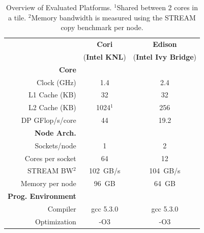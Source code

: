 
{
\setlength{\tabcolsep}{5pt}
\begin{table}[!t]{
\centering
\begin{tabular}{rcc}
					&  {\bf Cori} & {\bf Edison }    \\
					& ({\bf Intel KNL})  & ({\bf Intel Ivy Bridge})		\\
\hline%
{\bf Core }	 	 & 			& \\

\hline%
Clock (GHz)			& 1.4			& 2.4					\\
L1 Cache (KB)		& 32		& 32				\\
L2 Cache (KB)		& 1024$^1$		& 256				\\
DP GFlop/s/core		& 44			&19.2		\\
\hline%
{\bf Node Arch.}	 	 & 			& \\
\hline%
Sockets/node			&  1		&	2					\\
Cores per socket			& 64				& 12					\\
STREAM BW$^2$		&  102~GB/s 	&	104~GB/s		\\
Memory per node		&  96~GB	&	64~GB			\\
\hline%
{\bf Prog. Environment}	 	 & 			& \\
\hline%
Compiler & gcc 5.3.0 & gcc 5.3.0\\
Optimization & -O3 &  -O3 \\
\hline%
\end{tabular}

\caption{Overview of Evaluated Platforms.  $^1$Shared between 2 cores in a tile. $^2$Memory bandwidth is measured using the STREAM copy benchmark per node.}
\label{tab:machines}
}
\end{table}
}


